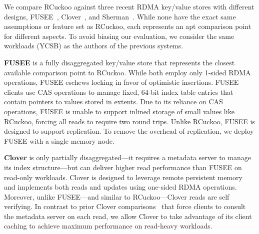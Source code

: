 
We compare RCuckoo against three recent RDMA key/value stores with
different designs, FUSEE~\cite{fusee}, Clover~\cite{clover}, and
Sherman~\cite{sherman}.  While none have the exact same assumptions or
feature set as RCuckoo, each represents an apt comparison point for
different aspects.  To avoid biasing our evaluation, we consider the same
workloads (YCSB) as the authors of the previous systems.
%

\textbf{FUSEE} is a fully disaggregated key/value store that
represents the closest available comparison point to RCuckoo.  While
both employ only 1-sided RDMA operations, FUSEE eschews locking in
favor of optimistic insertions.  FUSEE clients use CAS operations
to manage fixed, 64-bit index table entries that contain pointers to
values stored in extents.  Due to its reliance on CAS operations, FUSEE is unable to support inlined storage of small
values like RCuckoo, forcing all reads to require two round trips.
Unlike RCuckoo, FUSEE is designed to support replication.  To remove the overhead of replication, 
we deploy FUSEE with a single memory node.

\textbf{Clover} is only partially disaggregated---it requires a
metadata server to manage its index structure---but can deliver higher
read performance than FUSEE on read-only workloads.  Clover is
designed to leverage remote persistent memory and implements both
reads and updates using one-sided RDMA operations.  Moreover, unlike
FUSEE---and similar to RCuckoo---Clover reads are self verifying.
In contrast to prior Clover comparisons~\cite{fusee} that force
clients to consult the metadata server on each read, we allow Clover
to take advantage of its client caching to achieve maximum performance
on read-heavy workloads.

